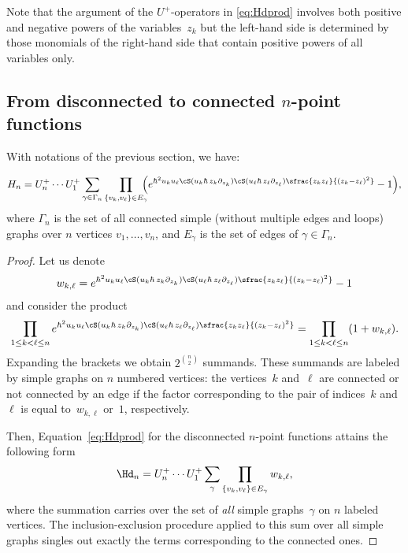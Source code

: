 \begin{remark}
Note that the argument of the $U^+$-operators in \eqref{eq:Hdprod} involves both positive and negative powers of the variables~$z_k$ but the left-hand side is determined by those monomials of the right-hand side that contain positive powers of all variables only.
\end{remark}

\subsection{From disconnected to connected \texorpdfstring{$n$}{n}-point functions}

With notations of the previous section, we have:
\skpt
\begin{proposition}\label{prop:Hnconn}\mbox{}\vspace*{-\baselineskip}
\begin{equation}\label{eq:Hnconn}
H_n
=U^+_n\cdots U^+_1
\sum_{\gamma \in \Gamma_n}\prod_{\{v_k,v_\ell\}\in E_\gamma}\hspace*{-2mm}
\Bigl(e^{\hbar^2u_ku_\ell\cS(u_k\hbar\,z_k\partial_{z_k})\cS(u_\ell\hbar\,z_\ell\partial_{z_\ell})
\sfrac{z_k z_\ell}{(z_k-z_\ell)^2}}-1\Bigr),
\end{equation}
where $\Gamma_n$ is the set of all connected simple (\ie without multiple edges and loops) graphs over $n$ vertices $v_1,\ldots,v_n$, and $E_\gamma$ is the set of edges of $\gamma \in \Gamma_n$.
\end{proposition}

\begin{proof}
Let us denote
\begin{equation*}
w_{k,\ell}=
e^{\hbar^2u_ku_\ell\cS(u_k\hbar\,z_k\partial_{z_k})\cS(u_\ell\hbar\,z_\ell\partial_{z_\ell})
\sfrac{z_k z_\ell}{(z_k-z_\ell)^2}}-1
\end{equation*}
and consider the product
\begin{equation*}
\prod_{1\le k<\ell\le n}
e^{\hbar^2u_ku_\ell\cS(u_k\hbar\,z_k\partial_{z_k})\cS(u_\ell\hbar\,z_\ell\partial_{z_\ell})
\sfrac{z_k z_\ell}{(z_k-z_\ell)^2}}
=\prod_{1\le k<\ell\le n}
(1+w_{k,\ell}).
\end{equation*}
Expanding the brackets we obtain $2^{\binom{n}{2}}$ summands. These summands are labeled by simple graphs on $n$ numbered vertices: the vertices~$k$ and~$\ell$ are connected or not connected by an edge if the factor corresponding to the pair of indices~$k$ and~$\ell$ is equal to~$w_{k,\ell}$ or~$1$, respectively.

Then, Equation~\eqref{eq:Hdprod} for the disconnected $n$-point functions attains the following form
\begin{equation*}
\Hd_n=U^+_n\cdots U^+_1
\sum_{\gamma}\prod_{\{v_k,v_\ell\}\in E_\gamma} w_{k,\ell},
\end{equation*}
where the summation carries over the set of \emph{all} simple graphs~$\gamma$ on $n$ labeled vertices. The inclusion-exclusion procedure applied to this sum over all simple graphs singles out exactly the terms corresponding to the connected ones.
\end{proof}

